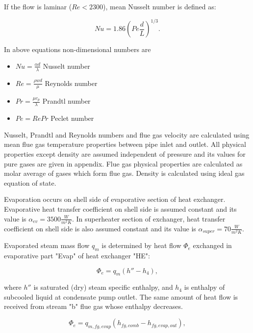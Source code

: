 \documentclass{article}
\begin{document}
	\noindent
	If the flow is laminar ($Re<2300$), mean Nusselt number is defined as:
	
	\begin{equation}\label{eq:nusselt2}
		Nu = 1.86 \left(Pe \frac{d}{L}\right)^{1/3}.
	\end{equation}
	
	\noindent
	In above equations non-dimensional numbers are
	
	\begin{itemize}
		\item $Nu = \frac{\alpha d}{\lambda}$ Nusselt number
		\item $Re = \frac{\rho w d}{\mu}$ Reynolds number
		\item $Pr = \frac{\mu c_p}{\lambda}$ Prandtl number
		\item $Pe = Re Pr$ Peclet number
	\end{itemize}

	\noindent
	Nusselt, Prandtl and Reynolds numbers and flue gas velocity are calculated using mean flue gas temperature properties between pipe inlet and outlet. All physical properties except density are assumed independent of pressure and its values for pure gases are given in appendix. Flue gas physical properties are calculated as molar average of gases which form flue gas. Density is calculated using ideal gas equation of state.
	
	\noindent
	Evaporation occurs on shell side of evaporative section of heat exchanger. Evaporative heat transfer coefficient on shell side is assumed constant and its value is $\alpha_{ev}=3500 \frac{W}{m^2 K}$. In superheater section of exchanger, heat transfer coefficient on shell side is also assumed constant and its value is $\alpha_{super}=70 \frac{W}{m^2 K}$.
	
	Evaporated steam mass flow $q_m$ is determined by heat flow $\Phi_e$ exchanged in evaporative part "Evap" of heat exchanger "HE":
	
	\begin{equation}\label{eq:evap_steam_mass}
		\Phi_e = q_m(h'' -h_4),
	\end{equation}
	
	where $h''$ is saturated (dry) steam specific enthalpy, and $h_4$ is 
	enthalpy of subcooled liquid at condensate pump outlet. 
	The same amount of heat flow is received from stream "b" flue gas whose enthalpy decreases.
	
	\begin{equation}\label{eq:evap_steam_mass2}
		\Phi_e = q_{m,fg,evap} (h_{fg,comb} - h_{fg,evap,out}),
	\end{equation}
	
\end{document}
